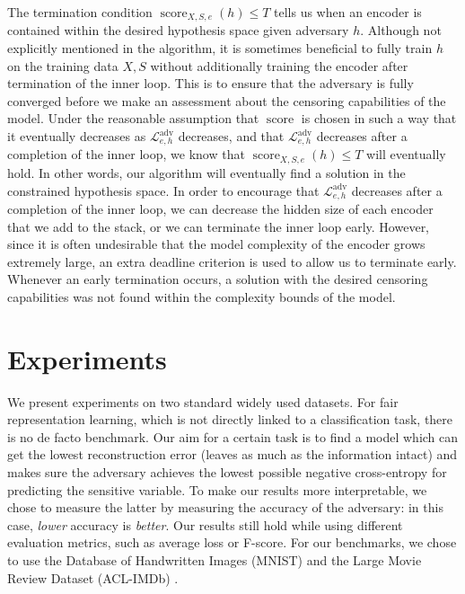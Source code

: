 \documentclass[nohyperref]{article}
\theoremstyle{plain}
\theoremstyle{definition}
\theoremstyle{remark}
\begin{document}
The termination condition $\mathop{score}_{X,S,e}(h) \leq T$ tells us when an encoder is contained within the desired hypothesis space given adversary $h$. Although not explicitly mentioned in the algorithm, it is sometimes beneficial to fully train $h$ on the training data $X, S$ without additionally training the encoder after termination of the inner loop. This is to ensure that the adversary is fully converged before we make an assessment about the censoring capabilities of the model. Under the reasonable assumption that $\mathop{score}$ is chosen in such a way that it eventually decreases as $\mathcal{L}^{\mathop{adv}}_{e,h}$ decreases, and that $\mathcal{L}^{\mathop{adv}}_{e,h}$ decreases after a completion of the inner loop, we know that $\mathop{score}_{X,S,e}(h) \leq T$ will eventually hold. In other words, our algorithm will eventually find a solution in the constrained hypothesis space. In order to encourage that $\mathcal{L}^{\mathop{adv}}_{e,h}$ decreases after a completion of the inner loop, we can decrease the hidden size of each encoder that we add to the stack, or we can terminate the inner loop early. However, since it is often undesirable that the model complexity of the encoder grows extremely large, an extra deadline criterion is used to allow us to terminate early. Whenever an early termination occurs, a solution with the desired censoring capabilities was not found within the complexity bounds of the model.

\section{Experiments}
\label{experiments}
We present experiments on two standard widely used datasets. For fair representation learning, which is not directly linked to a classification task, there is no de facto benchmark. Our aim for a certain task is to find a model which can get the lowest reconstruction error (leaves as much as the information intact) and makes sure the adversary achieves the lowest possible negative cross-entropy for predicting the sensitive variable. To make our results more interpretable, we chose to measure the latter by measuring the accuracy of the adversary: in this case, \emph{lower} accuracy is \emph{better}. Our results still hold while using different evaluation metrics, such as average loss or F-score. For our benchmarks, we chose to use the Database of Handwritten Images (MNIST) \cite{deng2012mnist} and the Large Movie Review Dataset (ACL-IMDb) \cite{maas-EtAl:2011:ACL-HLT2011}. 
\end{document}
